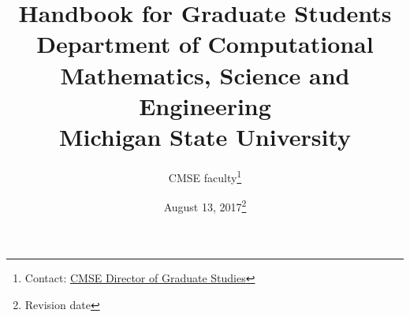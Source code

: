 \documentclass[12pt]{article}
\begin{document}
\vspace{-50mm}
\title{Handbook for Graduate Students\\
\vspace{20mm}
  \large Department of Computational Mathematics, Science and
  Engineering\\
\vspace{20mm}
Michigan State University
\vspace{50mm}
}

\author{CMSE faculty\footnote{Contact:
    \href{mailto:cmsegrad@msu.edu}{CMSE Director of Graduate Studies}
  }}

\date{August 13, 2017\footnote{Revision date}}

\maketitle

\newpage

\tableofcontents

\newpage



\newpage



\newpage



\newpage



\newpage



\newpage



\newpage



\newpage



\newpage



\newpage



\newpage



\newpage



\newpage

\appendix



\newpage



\newpage


\end{document}
